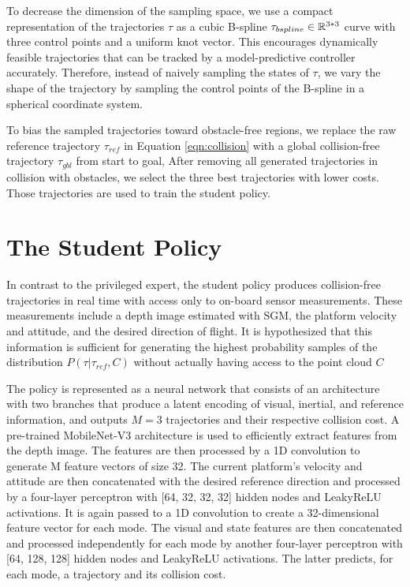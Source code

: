 To decrease the dimension of the sampling space, we use a compact
representation of the trajectories $\tau$ as a cubic B-spline $\tau_{bspline} \in \mathbb{R}^{3*3}$ curve with three control points and a
uniform knot vector. This encourages dynamically feasible trajectories that can be tracked by a model-predictive controller accurately. Therefore, instead of naively sampling the states of $\tau$, we vary the
shape of the trajectory by sampling the control points of the B-spline in a spherical coordinate system.

To bias the sampled trajectories toward obstacle-free regions, we replace the raw reference trajectory $\tau_{ref}$ in Equation \ref{eqn:collision} with a global
collision-free trajectory $\tau_{gbl}$ from start to goal, After removing all generated trajectories
in collision with obstacles, we select the three best trajectories with
lower costs. Those trajectories are used to train the student policy.


\section{The Student Policy}
In contrast to the privileged expert, the student policy produces
collision-free trajectories in real time with access only to on-board
sensor measurements. These measurements include a depth image
estimated with SGM, the platform velocity and attitude, and the
desired direction of flight. It is hypothesized that this information is
sufficient for generating the highest probability samples of the distribution $P(\tau | \tau_{ref}, C)$ without actually having access to the point cloud $C$ 

The policy is represented as a neural network that consists of an architecture with two branches that produce a latent encoding of visual,
inertial, and reference information, and outputs $M = 3$ trajectories
and their respective collision cost. A pre-trained MobileNet-V3 \cite{MobileNet} architecture is used to efficiently extract features from the depth image. The features are then processed by a 1D convolution to generate
M feature vectors of size 32. The current platform’s velocity and
attitude are then concatenated with the desired reference direction
and processed by a four-layer perceptron with [64, 32, 32, 32] hidden
nodes and LeakyReLU activations. It is again passed to a 1D convolution to create a 32-dimensional feature vector for each mode. The visual
and state features are then concatenated and processed independently
 for each mode by another four-layer perceptron with [64, 128, 128]
hidden nodes and LeakyReLU activations. The latter predicts, for
each mode, a trajectory and its collision cost. 

